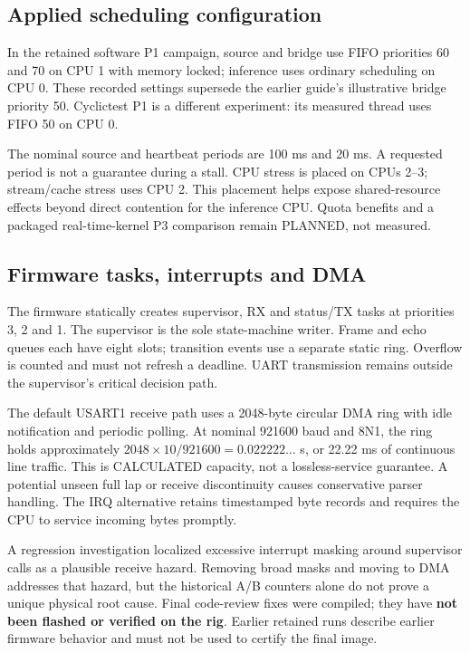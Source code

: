 \documentclass[a4paper,11pt]{article}
\newcommand{\page}{\clearpage}
\begin{document}
\subsection{Applied scheduling configuration}
In the retained software P1 campaign, source and bridge use FIFO priorities 60 and 70 on CPU 1 with memory locked; inference uses ordinary scheduling on CPU 0. These recorded settings supersede the earlier guide's illustrative bridge priority 50. Cyclictest P1 is a different experiment: its measured thread uses FIFO 50 on CPU 0.

The nominal source and heartbeat periods are 100 ms and 20 ms. A requested period is not a guarantee during a stall. CPU stress is placed on CPUs 2--3; stream/cache stress uses CPU 2. This placement helps expose shared-resource effects beyond direct contention for the inference CPU. Quota benefits and a packaged real-time-kernel P3 comparison remain PLANNED, not measured.
\page
\subsection{Firmware tasks, interrupts and DMA}
The firmware statically creates supervisor, RX and status/TX tasks at priorities 3, 2 and 1. The supervisor is the sole state-machine writer. Frame and echo queues each have eight slots; transition events use a separate static ring. Overflow is counted and must not refresh a deadline. UART transmission remains outside the supervisor's critical decision path.

The default USART1 receive path uses a 2048-byte circular DMA ring with idle notification and periodic polling. At nominal 921600 baud and 8N1, the ring holds approximately $2048 \times 10 / 921600 = 0.022222\ldots$ s, or 22.22 ms of continuous line traffic. This is CALCULATED capacity, not a lossless-service guarantee. A potential unseen full lap or receive discontinuity causes conservative parser handling. The IRQ alternative retains timestamped byte records and requires the CPU to service incoming bytes promptly.

A regression investigation localized excessive interrupt masking around supervisor calls as a plausible receive hazard. Removing broad masks and moving to DMA addresses that hazard, but the historical A/B counters alone do not prove a unique physical root cause. Final code-review fixes were compiled; they have \textbf{not been flashed or verified on the rig}. Earlier retained runs describe earlier firmware behavior and must not be used to certify the final image.
\end{document}
